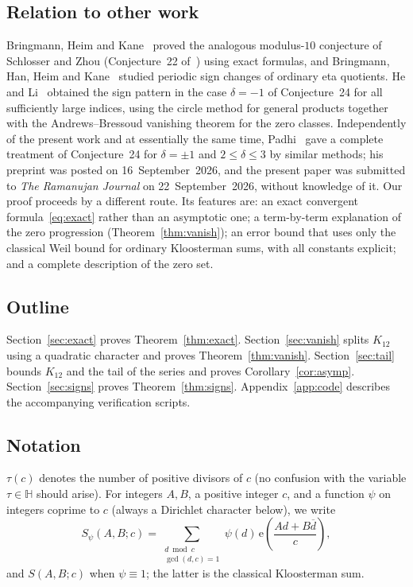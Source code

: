 \documentclass[11pt]{amsart}
\numberwithin{equation}{section}
\theoremstyle{definition}
\theoremstyle{remark}
\newcommand{\e}{\mathrm{e}}
\newcommand{\inv}[1]{\overline{#1}}
\begin{document}
\subsection{Relation to other work}
Bringmann, Heim and Kane~\cite{BHK} proved the analogous modulus-$10$ conjecture of Schlosser and Zhou (Conjecture~22 of~\cite{SZ}) using exact formulas, and Bringmann, Han, Heim and Kane~\cite{BHHK} studied periodic sign changes of ordinary eta quotients. He and Li~\cite{HL} obtained the sign pattern in the case $\delta=-1$ of Conjecture~24 for all sufficiently large indices, using the circle method for general products together with the Andrews--Bressoud vanishing theorem for the zero classes. Independently of the present work and at essentially the same time, Padhi~\cite{Padhi} gave a complete treatment of Conjecture~24 for $\delta=\pm1$ and $2\le\delta\le3$ by similar methods; his preprint was posted on 16~September~2026, and the present paper was submitted to \emph{The Ramanujan Journal} on 22~September~2026, without knowledge of it. Our proof proceeds by a different route. Its features are: an exact convergent formula~\eqref{eq:exact} rather than an asymptotic one; a term-by-term explanation of the zero progression (Theorem~\ref{thm:vanish}); an error bound that uses only the classical Weil bound for ordinary Kloosterman sums, with all constants explicit; and a complete description of the zero set.

\subsection{Outline}
Section~\ref{sec:exact} proves Theorem~\ref{thm:exact}. Section~\ref{sec:vanish} splits $K_{12}$ using a quadratic character and proves Theorem~\ref{thm:vanish}. Section~\ref{sec:tail} bounds $K_{12}$ and the tail of the series and proves Corollary~\ref{cor:asymp}. Section~\ref{sec:signs} proves Theorem~\ref{thm:signs}. Appendix~\ref{app:code} describes the accompanying verification scripts.

\subsection*{Notation}
$\tau(c)$ denotes the number of positive divisors of $c$ (no confusion with the variable $\tau\in\mathbb H$ should arise). For integers $A,B$, a positive integer $c$, and a function $\psi$ on integers coprime to $c$ (always a Dirichlet character below), we write
\begin{equation}\label{eq:S}
S_\psi(A,B;c)=\sum_{\substack{d\bmod c\\ \gcd(d,c)=1}}\psi(d)\,\e\!\left(\frac{Ad+B\inv d}{c}\right),
\end{equation}
and $S(A,B;c)$ when $\psi\equiv1$; the latter is the classical Kloosterman sum.
\end{document}
